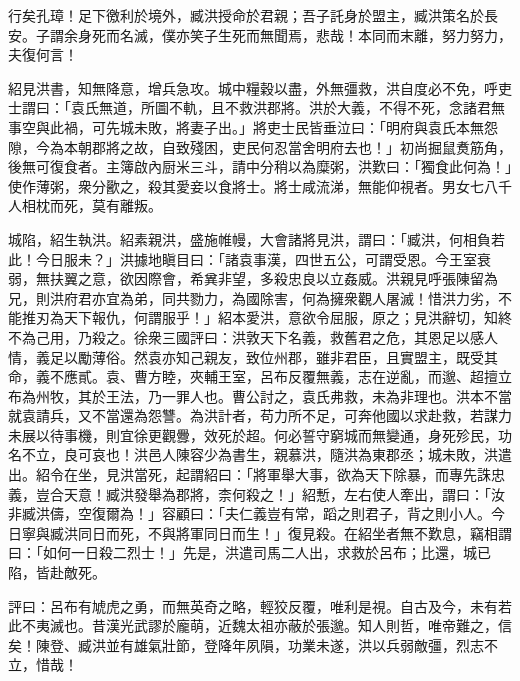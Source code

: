 \begin{pinyinscope}
行矣孔璋！足下徼利於境外，臧洪授命於君親；吾子託身於盟主，臧洪策名於長安。子謂余身死而名滅，僕亦笑子生死而無聞焉，悲哉！本同而末離，努力努力，夫復何言！

紹見洪書，知無降意，增兵急攻。城中糧穀以盡，外無彊救，洪自度必不免，呼吏士謂曰：「袁氏無道，所圖不軌，且不救洪郡將。洪於大義，不得不死，念諸君無事空與此禍，可先城未敗，將妻子出。」將吏士民皆垂泣曰：「明府與袁氏本無怨隙，今為本朝郡將之故，自致殘困，吏民何忍當舍明府去也！」初尚掘鼠煑筋角，後無可復食者。主簿啟內厨米三斗，請中分稍以為糜粥，洪歎曰：「獨食此何為！」使作薄粥，衆分歠之，殺其愛妾以食將士。將士咸流涕，無能仰視者。男女七八千人相枕而死，莫有離叛。

城陷，紹生執洪。紹素親洪，盛施帷幔，大會諸將見洪，謂曰：「臧洪，何相負若此！今日服未？」洪據地瞋目曰：「諸袁事漢，四世五公，可謂受恩。今王室衰弱，無扶翼之意，欲因際會，希兾非望，多殺忠良以立姦威。洪親見呼張陳留為兄，則洪府君亦宜為弟，同共勠力，為國除害，何為擁衆觀人屠滅！惜洪力劣，不能推刃為天下報仇，何謂服乎！」紹本愛洪，意欲令屈服，原之；見洪辭切，知終不為己用，乃殺之。徐衆三國評曰：洪敦天下名義，救舊君之危，其恩足以感人情，義足以勵薄俗。然袁亦知己親友，致位州郡，雖非君臣，且實盟主，既受其命，義不應貳。袁、曹方睦，夾輔王室，呂布反覆無義，志在逆亂，而邈、超擅立布為州牧，其於王法，乃一罪人也。曹公討之，袁氏弗救，未為非理也。洪本不當就袁請兵，又不當還為怨讐。為洪計者，苟力所不足，可奔他國以求赴救，若謀力未展以待事機，則宜徐更觀釁，效死於超。何必誓守窮城而無變通，身死殄民，功名不立，良可哀也！洪邑人陳容少為書生，親慕洪，隨洪為東郡丞；城未敗，洪遣出。紹令在坐，見洪當死，起謂紹曰：「將軍舉大事，欲為天下除暴，而專先誅忠義，豈合天意！臧洪發舉為郡將，柰何殺之！」紹慙，左右使人牽出，謂曰：「汝非臧洪儔，空復爾為！」容顧曰：「夫仁義豈有常，蹈之則君子，背之則小人。今日寧與臧洪同日而死，不與將軍同日而生！」復見殺。在紹坐者無不歎息，竊相謂曰：「如何一日殺二烈士！」先是，洪遣司馬二人出，求救於呂布；比還，城已陷，皆赴敵死。

評曰：呂布有虓虎之勇，而無英奇之略，輕狡反覆，唯利是視。自古及今，未有若此不夷滅也。昔漢光武謬於龐萌，近魏太祖亦蔽於張邈。知人則哲，唯帝難之，信矣！陳登、臧洪並有雄氣壯節，登降年夙隕，功業未遂，洪以兵弱敵彊，烈志不立，惜哉！


\end{pinyinscope}